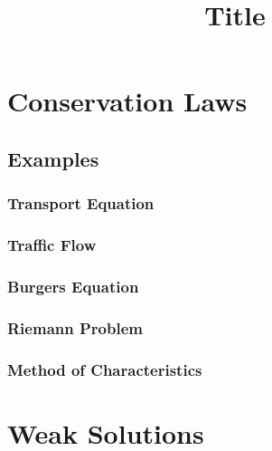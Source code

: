 \documentclass[
  fourColumns,
  landscape
]{formularyETH/formularyETH}
\title{Title}
\begin{document}
\tableofcontents
\newpage
\section{Conservation Laws}\label{sec:conservation_laws}
  
  \subsection{Examples}\label{subsec:examples}
    \subsubsection{Transport Equation}\label{subsec:transport_equation}
      
    \subsubsection{Traffic Flow}\label{subsec:traffic_flow}
    \subsubsection{Burgers Equation}\label{subsec:burgers_equation}
      
        
    \subsubsection{Riemann Problem}\label{subsubsec:riemann_problem}
      
    \subsubsection{Method of Characteristics}\label{subsubsec:for_conservation_laws}
        

\section{Weak Solutions}
  
  
  
\end{document}
